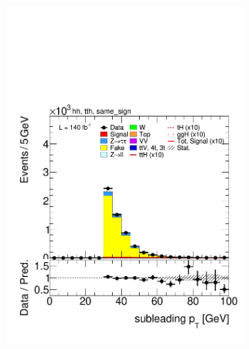 \begin{figure}[htbp]
    \begin{subfigure}[b]{0.45\textwidth}
      \centering
      \includegraphics[width=\textwidth]{images/same_sign_same_sign_run2/plot_tau_1_pt_hh_tth_15_16_17_18_same_sign.pdf}
      \caption{}
    \end{subfigure}
    \hfill
    \begin{subfigure}[b]{0.45\textwidth}
      \centering

\end{subfigure}
\end{figure}
